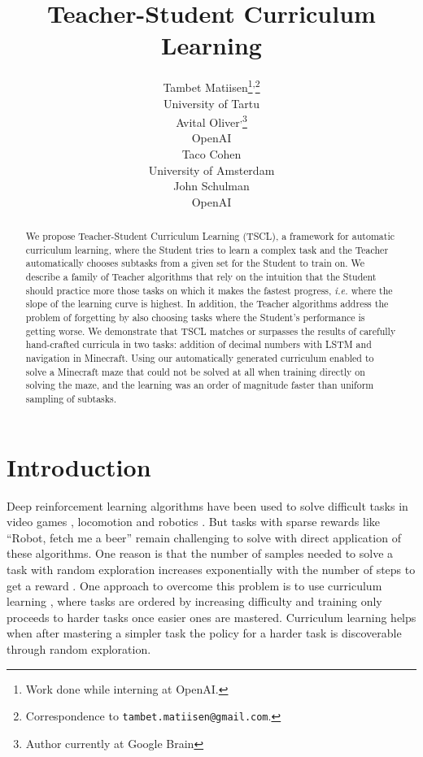 \documentclass{article}
\title{Teacher-Student Curriculum Learning}
\author{
  Tambet Matiisen\thanks{Work done while interning at OpenAI.}\phantom{\footnotesize 1}\textsuperscript{,}\thanks{Correspondence to \texttt{tambet.matiisen@gmail.com}.} \\
  University of Tartu \\
  \And
  Avital Oliver\footnotemark[1]\phantom{\footnotesize 1}\textsuperscript{,}\thanks{Author currently at Google Brain} \\
  OpenAI \\
  \And
  Taco Cohen\footnotemark[1] \\
  University of Amsterdam \\
  \And
  John Schulman \\
  OpenAI \\
}
\begin{document}

\maketitle

\begin{abstract}

We propose Teacher-Student Curriculum Learning (TSCL), a framework for automatic curriculum learning, where the Student tries to learn a complex task and the Teacher automatically chooses subtasks from a given set for the Student to train on. We describe a family of Teacher algorithms that rely on the intuition that the Student should practice more those tasks on which it makes the fastest progress,\textit{ i.e.} where the slope of the learning curve is highest. In addition, the Teacher algorithms address the problem of forgetting by also choosing tasks where the Student's performance is getting worse.
We demonstrate that TSCL matches or surpasses
the results of carefully hand-crafted curricula in two tasks: addition of decimal numbers with LSTM and navigation in Minecraft. Using our automatically generated curriculum enabled to solve a Minecraft maze that could not be solved at all when training directly on solving the maze, and the learning was an order of magnitude faster than uniform sampling of subtasks.

\end{abstract}

\section{Introduction}

Deep reinforcement learning algorithms have been used to solve difficult tasks in video games \citep{Mnih2015}, locomotion \citep{Schulman2015, lillicrap2015continuous} and robotics \citep{Levine2015}. But tasks with sparse rewards like ``Robot, fetch me a beer'' remain challenging to solve with direct application of these algorithms. One reason is that the number of samples needed to solve a task with random exploration increases exponentially with the number of steps to get a reward \citep{langford2011efficient}. One approach to overcome this problem is to use curriculum learning \citep{Bengio2009,Zaremba2014,Graves2016,wu2017training}, where tasks are ordered by increasing difficulty and training only proceeds to harder tasks once easier ones are mastered. Curriculum learning helps when after mastering a simpler task the policy for a harder task is discoverable through random exploration.
\end{document}
